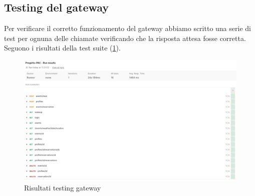 \subsection{Testing del gateway}
Per verificare il corretto funzionamento del gateway abbiamo scritto una serie di test per ognuna delle chiamate verificando che la risposta attesa fosse corretta. Seguono i risultati della test suite (\ref{fig:risTestGateway}).
\begin{figure}[h!]
  \includegraphics[width=1\textwidth]{Iterazione 3/images/gatewayTest.png}
  \caption{Risultati testing gateway}
  \label{fig:risTestGateway}
\end{figure}